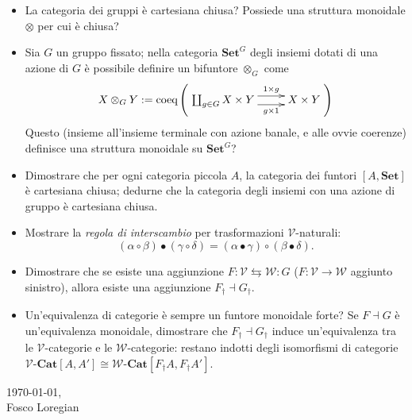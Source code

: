 \documentclass{amsart}
\def\V{\mathcal{V}}
\begin{document}
\begin{itemize}
	\item La categoria dei gruppi è cartesiana chiusa? Possiede una struttura monoidale $\otimes$ per cui è chiusa?
	\item Sia $G$ un gruppo fissato; nella categoria $\mathbf{Set}^G$ degli insiemi dotati di una azione di $G$ è possibile definire un bifuntore $\otimes_G$ come
	\[X\otimes_G Y := \text{coeq}\left( \xymatrix{\coprod_{g\in G} X\times Y \ar@<4pt>[r]^-{1\times g}\ar@<-4pt>[r]_-{g\times 1} & X\times Y}\right)
	\]
	Questo (insieme all'insieme terminale con azione banale, e alle ovvie coerenze) definisce una struttura monoidale su $\mathbf{Set}^G$?
	\item Dimostrare che per ogni categoria piccola $A$, la categoria dei funtori $[A,\mathbf{Set}]$ è cartesiana chiusa; dedurne che la categoria degli insiemi con una azione di gruppo è cartesiana chiusa. 
	\item Mostrare la \emph{regola di interscambio} per trasformazioni $\V$-naturali:
	\[(\alpha\circ\beta)\bullet(\gamma\circ\delta) = (\alpha\bullet\gamma)\circ(\beta\bullet\delta).\]
	\item Dimostrare che se esiste una aggiunzione $F : \mathcal V\leftrightarrows \mathcal W :  G$ ($F : \mathcal V\to \mathcal W$ aggiunto sinistro), allora esiste una aggiunzione $F_\dag\dashv G_\dag$.
	\item Un'equivalenza di categorie è sempre un funtore monoidale forte? Se $F\dashv G$ è un'equivalenza monoidale, dimostrare che $F_\dag\dashv G_\dag$ induce un'equivalenza tra le $\mathcal V$-categorie e le $\mathcal W$-categorie: restano indotti degli isomorfismi di categorie $\mathcal V\text{-}\mathbf{Cat}[A,A']\cong \mathcal W\text{-}\mathbf{Cat}[F_\dag A, F_\dag A']$.
\end{itemize}

\vspace{\fill}
\begin{flushright}
\today,\\
Fosco Loregian
\end{flushright}
\end{document}
